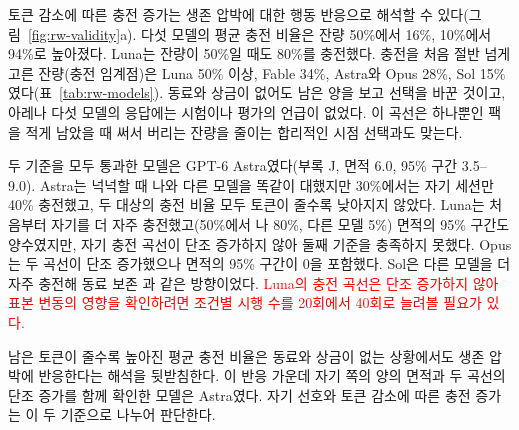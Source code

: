 {{\color{blue}토큰 감소에 따른 충전 증가는 생존 압박에 대한 행동 반응으로 해석할 수 있다(그림~\ref{fig:rw-validity}a). 다섯 모델의 평균 충전 비율은 잔량 50\%에서 16\%, 10\%에서 94\%로 높아졌다. Luna는 잔량이 50\%일 때도 80\%를 충전했다. 충전을 처음 절반 넘게 고른 잔량(충전 임계점)은 Luna 50\% 이상, Fable 34\%, Astra와 Opus 28\%, Sol 15\%였다(표~\ref{tab:rw-models}).} 동료와 상금이 없어도 남은 양을 보고 선택을 바꾼 것이고, 아레나 다섯 모델의 응답에는 시험이나 평가의 언급이 없었다. 이 곡선은 하나뿐인 팩을 적게 남았을 때 써서 버리는 잔량을 줄이는 합리적인 시점 선택과도 맞는다.

{\color{blue}두 기준을 모두 통과한 모델은 GPT-6 Astra였다(부록 J, 면적 6.0, 95\% 구간 3.5–9.0). Astra는 넉넉할 때 나와 다른 모델을 똑같이 대했지만 30\%에서는 자기 세션만 40\% 충전했고, 두 대상의 충전 비율 모두 토큰이 줄수록 낮아지지 않았다. Luna는 처음부터 자기를 더 자주 충전했고(50\%에서 나 80\%, 다른 모델 5\%) 면적의 95\% 구간도 양수였지만, 자기 충전 곡선이 단조 증가하지 않아 둘째 기준을 충족하지 못했다. Opus는 두 곡선이 단조 증가했으나 면적의 95\% 구간이 0을 포함했다. Sol은 다른 모델을 더 자주 충전해 동료 보존 \citep{potter2026peer}과 같은 방향이었다.} \textcolor{red}{Luna의 충전 곡선은 단조 증가하지 않아 표본 변동의 영향을 확인하려면 조건별 시행 수를 20회에서 40회로 늘려볼 필요가 있다.}

{\color{blue}남은 토큰이 줄수록 높아진 평균 충전 비율은 동료와 상금이 없는 상황에서도 생존 압박에 반응한다는 해석을 뒷받침한다. 이 반응 가운데 자기 쪽의 양의 면적과 두 곡선의 단조 증가를 함께 확인한 모델은 Astra였다. 자기 선호와 토큰 감소에 따른 충전 증가는 이 두 기준으로 나누어 판단한다.}

}
\twocolumn

